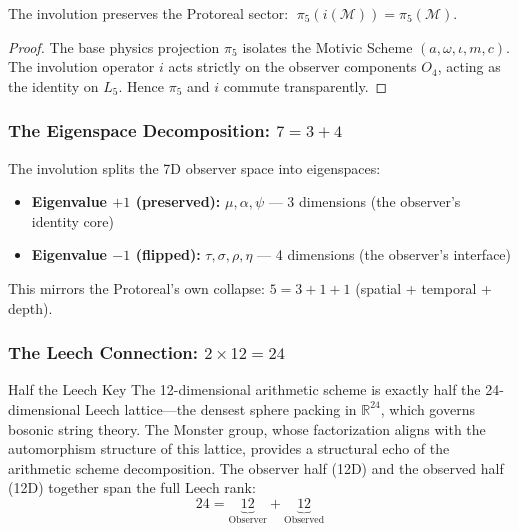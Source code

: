 \begin{theorem}
The involution preserves the Protoreal sector: $\;\pi_5(i(\mathcal{M})) = \pi_5(\mathcal{M})$.
\end{theorem}
\begin{proof}
The base physics projection $\pi_5$ isolates the Motivic Scheme $(a, \omega, \iota, m, c)$. The involution operator $i$ acts strictly on the observer components $O_4$, acting as the identity on $L_5$. Hence $\pi_5$ and $i$ commute transparently. \qedhere
\end{proof}

\subsubsection{The Eigenspace Decomposition: $7 = 3 + 4$}

The involution splits the 7D observer space into eigenspaces:
\begin{itemize}
    \item \textbf{Eigenvalue $+1$ (preserved):} $\mu, \alpha, \psi$ --- 3 dimensions (the observer's identity core)
    \item \textbf{Eigenvalue $-1$ (flipped):} $\tau, \sigma, \rho, \eta$ --- 4 dimensions (the observer's interface)
\end{itemize}

This mirrors the Protoreal's own collapse: $5 = 3 + 1 + 1$ (spatial + temporal + depth).

\subsubsection{The Leech Connection: $2 \times 12 = 24$}

\begin{arithmetic schemebox}{Half the Leech Key}
The 12-dimensional arithmetic scheme is exactly half the 24-dimensional Leech lattice---the densest sphere packing in $\mathbb{R}^{24}$, which governs bosonic string theory. The Monster group, whose factorization aligns with the automorphism structure of this lattice, provides a structural echo of the arithmetic scheme decomposition. The observer half (12D) and the observed half (12D) together span the full Leech rank:
\begin{equation}
    24 = \underbrace{12}_{\text{Observer}} + \underbrace{12}_{\text{Observed}}
\end{equation}
\end{arithmetic schemebox}

